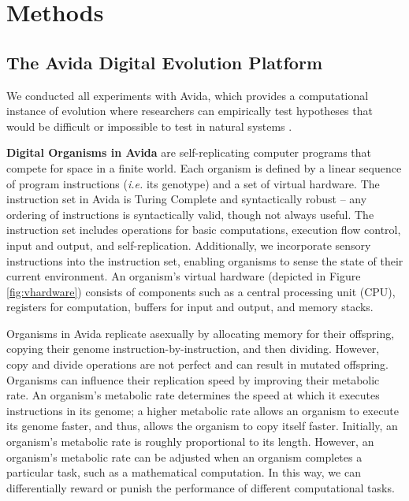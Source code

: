 \section{Methods} \label{sec:methods}



\subsection{The Avida Digital Evolution Platform}
We conducted all experiments with Avida, which provides a computational instance of evolution where researchers can empirically test hypotheses that would be difficult or impossible to test in natural systems \citep{Ofria:2009avida}.



\noindent
\textbf{Digital Organisms in Avida} are self-replicating computer programs that compete for space in a finite world.  Each organism is defined by a linear sequence of program instructions (\textit{i.e.} its genotype) and a set of virtual hardware. The instruction set in Avida is Turing Complete and syntactically robust -- any ordering of instructions is syntactically valid, though not always useful. The instruction set includes operations for basic computations, execution flow control, input and output, and self-replication. Additionally, we incorporate sensory instructions into the instruction set, enabling organisms to sense the state of their current environment. An organism's virtual hardware (depicted in Figure \ref{fig:vhardware}) consists of components such as a central processing unit (CPU), registers for computation, buffers for input and output, and memory stacks.

Organisms in Avida replicate asexually by allocating memory for their offspring, copying their genome instruction-by-instruction, and then dividing. However, copy and divide operations are not perfect and can result in mutated offspring. Organisms can influence their replication speed by improving their metabolic rate. An organism's metabolic rate determines the speed at which it executes instructions in its genome; a higher metabolic rate allows an organism to execute its genome faster, and thus, allows the organism to copy itself faster. Initially, an organism's metabolic rate is roughly proportional to its length. However, an organism's metabolic rate can be adjusted when an organism completes a particular task, such as a mathematical computation. In this way, we can differentially reward or punish the performance of different computational tasks.

